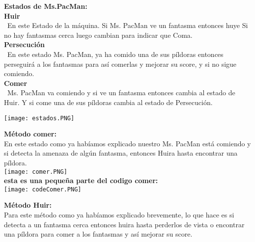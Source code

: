 \documentclass[11pt]{article}
\begin{document}
\newpage

\textbf{Estados de Ms.PacMan:}\\
\linebreak
\textbf{Huir}\\\
En este Estado de la máquina. Si Ms. PacMan ve un fantasma entonces huye Si no hay fantasmas cerca luego cambian para indicar que Coma.\\
\linebreak
\textbf{Persecución}\\\
En este estado Ms. PacMan, ya ha comido una de sus píldoras entonces perseguirá a los fantasmas para así comerlas y mejorar su score, y si no sigue comiendo.\\
\linebreak
\textbf{Comer} \\\
Ms. PacMan va comiendo y si ve un fantasma entonces cambia al estado de Huir. Y si come una de sus píldoras cambia al estado de Persecución.\\
\linebreak

\texttt{[image: estados.PNG]} 

\newpage

\textbf{Método comer:}\\
\linebreak
En este estado como ya habíamos explicado nuestro Ms. PacMan está comiendo y si detecta la amenaza de algún fantasma, entonces Huira hasta encontrar una píldora.\\
\linebreak
\texttt{[image: comer.PNG]} \\
\textbf{esta es una pequeña parte del codigo comer:}\\
\linebreak
\texttt{[image: codeComer.PNG]} 

\newpage

\textbf{Método Huir:}\\
\linebreak
Para este método como ya habíamos explicado brevemente, lo que hace es si detecta a un fantasma cerca entonces huira hasta perderlos de vista o encontrar una píldora para comer a los fantasmas y así mejorar su score.\\
\linebreak
\end{document}
